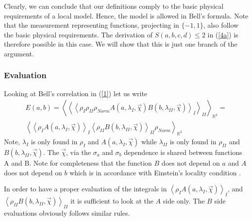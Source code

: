 \documentclass{appolb}
\begin{document}
Clearly, we can conclude that our definitions comply to the basic physical requirements of a local model. Hence, the model is allowed in Bell's formula. Note that the measurement representing functions, projecting in $\{-1,1\}$, also follow the basic physical requirements. The derivation of $S(a,b,c,d)\leq 2$ in (\ref{4a}) is therefore possible in this case. We will show that this is just one branch of the argument.
\subsubsection{Evaluation}
Looking at Bell's correlation in (\ref{1}) let us write
\begin{eqnarray}\label{18}
E(a,b)=\left \langle\left \langle \left \langle \rho_{I}  \rho_{II} \rho_{Norm}A(a,\lambda_{I},\vec{\chi}) B(b,\lambda_{II},\vec{\chi})\right\rangle_{I}\right\rangle_{II}\right\rangle_{\mathbb{R}^3} = \nonumber \\
\left\langle \left\langle \rho_{I} A(a,\lambda_{I},\vec{\chi})\right\rangle_{I} \left\langle\rho_{II}B(b,\lambda_{II},\vec{\chi}) \right\rangle_{II}\rho_{Norm} \right\rangle_{\mathbb{R}^3}
\end{eqnarray}
Note, $\lambda_{I}$ is only found in $\rho_{I}$ and $A(a,\lambda_{I},\vec{\chi})$ while  $\lambda_{II}$ is only found in $\rho_{II}$ and $B(b,\lambda_{II},\vec{\chi})$. The $\vec{\chi}$, via the $\sigma_a$ and $\sigma_b$ dependence is shared between functions A and B. Note for completeness that the function $B$ does not depend on $a$ and $A$ does not depend on $b$ which is in accordance with Einstein's locality condition \cite{1}.

In order to have a proper evaluation of the integrals in $\left \langle \rho_{I} A(a,\lambda_{I},\vec{\chi})\right\rangle_{I}$, and $\left \langle \rho_{II}B(b,\lambda_{II},\vec{\chi}) \right\rangle_{II}$ it is sufficient to look at the $A$ side only. 
The $B$ side evaluations obviously follows similar rules.
\end{document}
